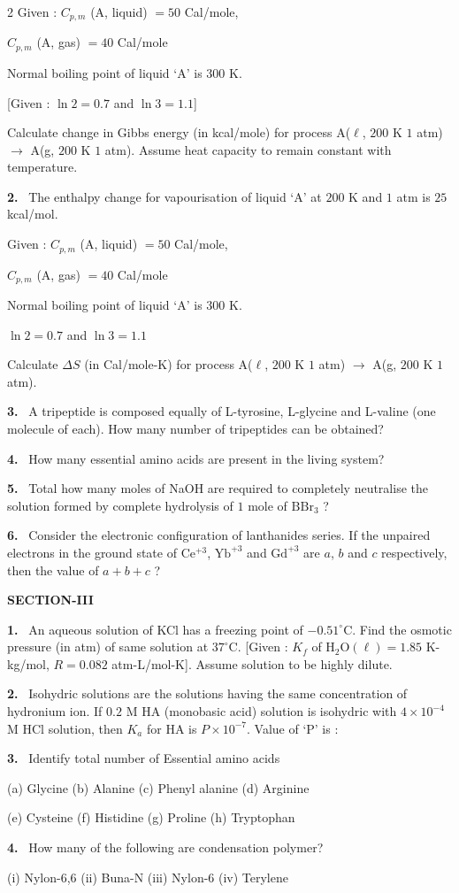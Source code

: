 \documentclass[10pt]{extarticle}
\newcommand{\sect}[1]{\par\smallskip\noindent\textbf{#1}\par}
\newcommand{\qn}[1]{\par\smallskip\noindent\textbf{#1.}~}
\begin{document}
\begin{multicols}{2}
Given : $C_{p,m}$ (A, liquid) $=50$ Cal/mole,

$C_{p,m}$ (A, gas) $=40$ Cal/mole

Normal boiling point of liquid `A' is $300$ K.

[Given : $\ln2=0.7$ and $\ln3=1.1$]

Calculate change in Gibbs energy (in kcal/mole) for process A($\ell$, $200$ K $1$ atm) $\to$ A(g, $200$ K $1$ atm). Assume heat capacity to remain constant with temperature.
\qn{2} The enthalpy change for vapourisation of liquid `A' at $200$ K and $1$ atm is $25$ kcal/mol.

Given : $C_{p,m}$ (A, liquid) $=50$ Cal/mole,

$C_{p,m}$ (A, gas) $=40$ Cal/mole

Normal boiling point of liquid `A' is $300$ K.

$\ln2=0.7$ and $\ln3=1.1$

Calculate $\Delta S$ (in Cal/mole-K) for process A($\ell$, $200$ K $1$ atm) $\to$ A(g, $200$ K $1$ atm).
\qn{3} A tripeptide is composed equally of L-tyrosine, L-glycine and L-valine (one molecule of each). How many number of tripeptides can be obtained?
\qn{4} How many essential amino acids are present in the living system?
\qn{5} Total how many moles of NaOH are required to completely neutralise the solution formed by complete hydrolysis of $1$ mole of $\mathrm{BBr_3}$ ?
\qn{6} Consider the electronic configuration of lanthanides series. If the unpaired electrons in the ground state of $\mathrm{Ce^{+3}}$, $\mathrm{Yb^{+3}}$ and $\mathrm{Gd^{+3}}$ are $a$, $b$ and $c$ respectively, then the value of $a+b+c$ ?
\sect{SECTION-III}
\qn{1} An aqueous solution of KCl has a freezing point of $-0.51^\circ$C. Find the osmotic pressure (in atm) of same solution at $37^\circ$C. [Given : $K_f$ of $\mathrm{H_2O}(\ell)=1.85$ K-kg/mol, $R=0.082$ atm-L/mol-K]. Assume solution to be highly dilute.
\qn{2} Isohydric solutions are the solutions having the same concentration of hydronium ion. If $0.2$ M HA (monobasic acid) solution is isohydric with $4\times10^{-4}$ M HCl solution, then $K_a$ for HA is $P\times10^{-7}$. Value of `P' is :
\qn{3} Identify total number of Essential amino acids

(a) Glycine \quad (b) Alanine \quad (c) Phenyl alanine \quad (d) Arginine

(e) Cysteine \quad (f) Histidine \quad (g) Proline \quad (h) Tryptophan
\qn{4} How many of the following are condensation polymer?

(i) Nylon-6,6 \quad (ii) Buna-N \quad (iii) Nylon-6 \quad (iv) Terylene


\end{multicols}
\end{document}
